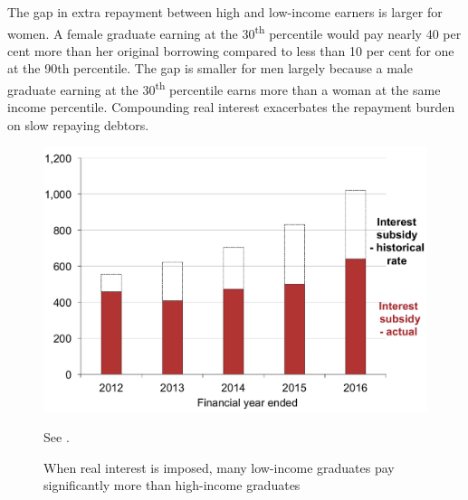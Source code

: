 \documentclass[embargoed]{grattan}
\begin{document}
The gap in extra repayment between high and low-income earners is larger for women.
A female graduate earning at the 30\textsuperscript{th} percentile would pay nearly 40 per cent more than her original borrowing compared to less than 10 per cent for one at the 90th percentile.
The gap is smaller for men largely because a male graduate earning at the 30\textsuperscript{th} percentile earns more than a woman at the same income percentile.
Compounding real interest exacerbates the repayment burden on slow repaying debtors.


\begin{figure}
\caption{When real interest is imposed, many low-income graduates pay significantly more than high-income graduates}\label{fig:fig14-when-real-interest-imposed-many-low-income-grads-pay-signif-more-than-high-income-grads}


\includegraphics[page=14]{atlas/Chartpack.pdf}

%
{See .}
\end{figure}
\end{document}
